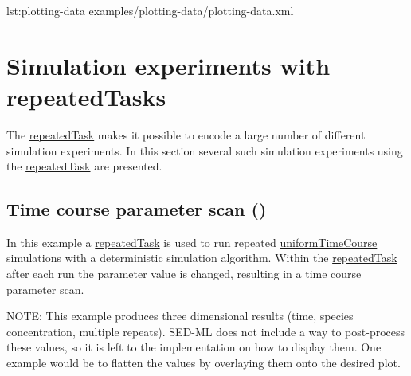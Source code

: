 {lst:plotting-data}
{examples/plotting-data/plotting-data.xml}

\section{Simulation experiments with repeatedTasks}
The \hyperref[class:repeatedTask]{repeatedTask} makes it possible to encode a large number of different simulation experiments. In this section several such simulation experiments using the \hyperref[class:repeatedTask]{repeatedTask} are presented.

\subsection{Time course parameter scan ()}
In this example a \hyperref[class:repeatedTask]{repeatedTask} is used to run repeated \hyperref[class:uniformTimeCourse]{uniformTimeCourse} simulations with a deterministic simulation algorithm. Within the \hyperref[class:repeatedTask]{repeatedTask} after each run the parameter value is changed, resulting in a time course parameter scan.

NOTE: This example produces three dimensional results (time, species concentration, multiple repeats).  SED-ML \currentLV does not include a way to post-process these values, so it is left to the implementation on how to display them. One example would be to flatten the values by overlaying them onto the desired plot. 


